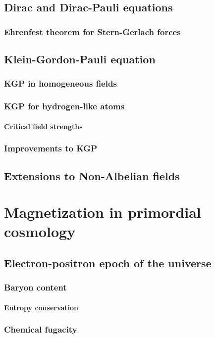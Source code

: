 \documentclass[a4paper]{report}
\begin{document}
    \section{Dirac and Dirac-Pauli equations}
        \subsection{Ehrenfest theorem for Stern-Gerlach forces}
    \section{Klein-Gordon-Pauli equation}
        \subsection{KGP in homogeneous fields}
        \subsection{KGP for hydrogen-like atoms}
            \subsubsection{Critical field strengths}
        \subsection{Improvements to KGP}
    \section{Extensions to Non-Albelian fields}

\chapter{Magnetization in primordial cosmology}
    \section{Electron-positron epoch of the universe}
        \subsection{Baryon content}
            \subsubsection{Entropy conservation}
        \subsection{Chemical fugacity}
\end{document}
